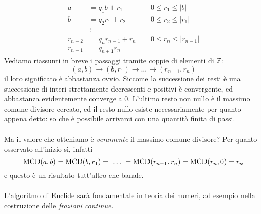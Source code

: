 \begin{osservazione}
\begin{equation*}
\begin{array}{rllll}
		a 		& = q_1b + r_1 & \quad\ 0 \leq r_1 \leq  |b|\\
		b 		& = q_2r_1 + r_2 & \quad\ 0 \leq r_2 \leq |r_1|\\
		   		& \,\vdots 		  & \\		
		r_{n-2} & = q_{n}r_{n-1}+r_n & \quad\ 0 \leq r_n \leq |r_{n-1}|\\
		r_{n-1} & = q_{n+1}r_n		 & 
	\end{array}
\end{equation*}
Vediamo riassunti in breve i passaggi tramite coppie di elementi di $\mathbb{Z}$:
\begin{equation*}
(a,b) \to (b,r_1)\to\dots\to(r_{n-1},r_n)
\end{equation*}
il loro significato è abbastanza ovvio. Siccome la successione dei resti è una successione di interi strettamente decrescenti e positivi è convergente, ed abbastanza evidentemente converge a $0$. L'ultimo resto non nullo è il massimo comune divisore cercato, ed il resto nullo esiste necessariamente per quanto appena detto: so che è possibile arrivarci con una quantità finita di passi. \\ \\ Ma il valore che otteniamo è \textit{veramente} il massimo comune divisore? Per quanto osservato all'inizio sì, infatti 
\begin{equation*}	
	\operatorname{\mathrm{MCD}}(a,b)= \operatorname{\mathrm{MCD}}(b,r_1)= \ \dots \ = \operatorname{\mathrm{MCD}}(r_{n-1},r_n)= \operatorname{\mathrm{MCD}}(r_{n},0) = r_n
\end{equation*}
e questo è un risultato tutt'altro che banale. \\ \\
L'algoritmo di Euclide sarà fondamentale in teoria dei numeri, ad esempio nella costruzione delle \textit{frazioni continue}.
\end{osservazione}
